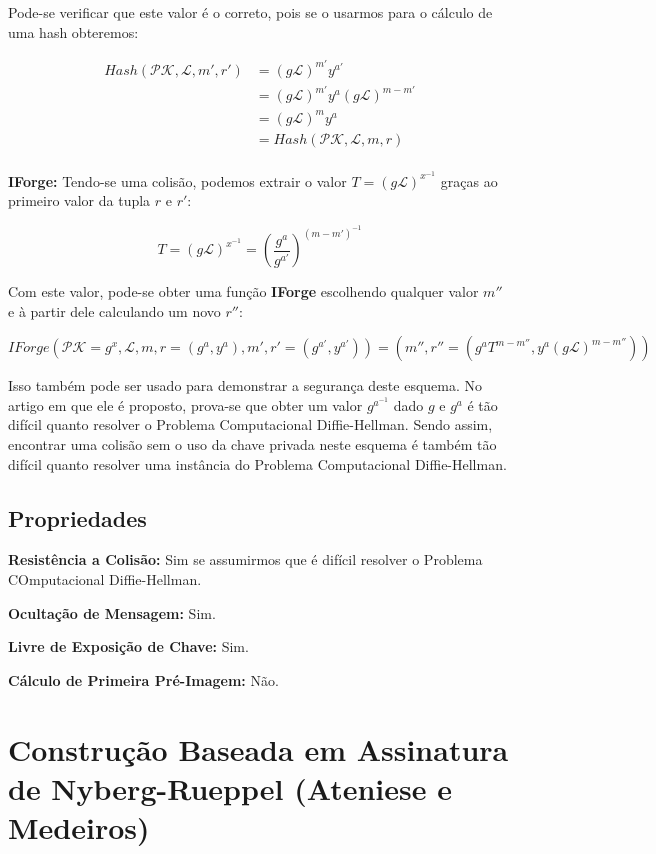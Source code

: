 \documentclass[a4paper]{article}
\begin{document}
Pode-se verificar que este valor é o correto, pois se o usarmos para o
cálculo de uma hash obteremos:

\begin{equation}
\begin{split}
  Hash(\mathcal{PK},\mathcal{L}, m', r') &= (g\mathcal{L})^{m'}y^{a'}\\
  &= (g\mathcal{L})^{m'}y^{a}(g\mathcal{L})^{m-m'}\\
  &= (g\mathcal{L})^{m}y^{a}\\
  &= Hash(\mathcal{PK},\mathcal{L}, m, r)\\
\end{split}
\end{equation}

\textbf{IForge:} Tendo-se uma colisão, podemos extrair o valor $T =
(g\mathcal{L})^{x^{-1}}$ graças ao primeiro valor da tupla $r$ e $r'$:

$$
T = (g\mathcal{L})^{x^{-1}} = \left(\frac{g^a}{g^{a'}}\right)^{(m-m')^{-1}}
$$

Com este valor, pode-se obter uma função \textbf{IForge} escolhendo
qualquer valor $m''$ e à partir dele calculando um novo $r''$:

$$ IForge(\mathcal{PK}=g^x, \mathcal{L}, m, r=(g^a, y^a), m',
r'=(g^{a'}, y^{a'})) = (m'', r''=(g^aT^{m-m''},
y^{a}(g\mathcal{L})^{m-m''}))
$$

Isso também pode ser usado para demonstrar a segurança deste
esquema. No artigo em que ele é proposto, prova-se que obter um valor
$g^{a^{-1}}$ dado $g$ e $g^a$ é tão difícil quanto resolver o Problema
Computacional Diffie-Hellman. Sendo assim, encontrar uma colisão sem o
uso da chave privada neste esquema é também tão difícil quanto
resolver uma instância do Problema Computacional Diffie-Hellman.

\subsection{Propriedades}

\textbf{Resistência a Colisão: }Sim se assumirmos que é difícil resolver o Problema COmputacional Diffie-Hellman.

\textbf{Ocultação de Mensagem: }Sim.

\textbf{Livre de Exposição de Chave: } Sim.

\textbf{Cálculo de Primeira Pré-Imagem: }Não.

\section{Construção Baseada em Assinatura de Nyberg-Rueppel (Ateniese e Medeiros) \cite{ateniese}}
\end{document}
